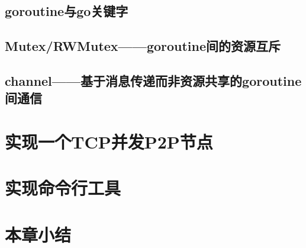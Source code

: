 \subsection{goroutine与go关键字}

\subsection{Mutex/RWMutex——goroutine间的资源互斥}

\subsection{channel——基于消息传递而非资源共享的goroutine间通信}

\section{实现一个TCP并发P2P节点}

\section{实现命令行工具}

\section{本章小结}
